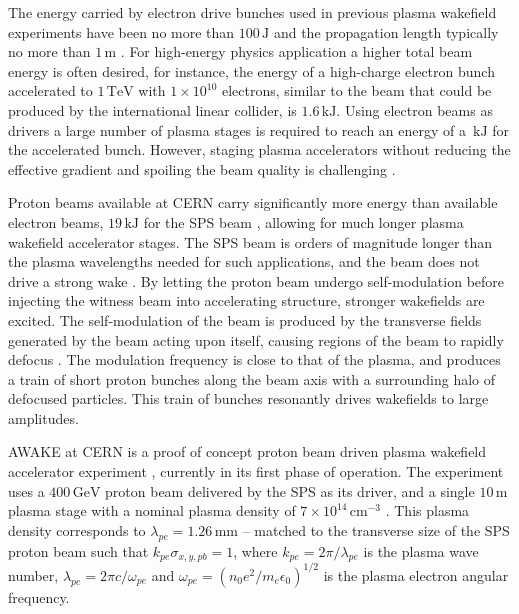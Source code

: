 \documentclass[aps,prstab,reprint,amsmath,amssymb,groupedaddress]{revtex4-1}
\newcommand{\unit}[1]{\,\mathrm{#1}}
\newcommand{\nexp}[1]{\times 10^{#1}}
\begin{document}
The energy carried by electron drive bunches used in previous plasma wakefield experiments have been no more than
$100\unit{J}$ and the propagation length typically no more than $1\unit{m}$ \cite{blumenfeld:2007,caldwell:2009}. For
high-energy physics application a higher total beam energy is often desired, for instance, the energy of a high-charge
electron bunch accelerated to $1\unit{TeV}$ with $1\nexp{10}$ electrons, similar to the beam that could be produced by
the international linear collider, is $1.6\unit{kJ}$. Using electron beams as drivers a large number of plasma stages is
required to reach %
an energy of a $\unit{kJ}$ for the accelerated bunch. However, staging plasma accelerators without reducing the
effective gradient and spoiling the beam quality is challenging \cite{steinke:2016,lindstrom:2016}.

Proton beams available at CERN carry significantly more energy than available electron beams, $19\unit{kJ}$ for the SPS
beam \cite{gschwendtner:2016}, allowing for much longer plasma wakefield accelerator stages. The SPS beam is orders of
magnitude longer than the plasma wavelengths needed for such applications, and the beam %
does not drive a strong wake \cite{gschwendtner:2016}.  By letting the proton beam undergo self-modulation before
injecting the witness beam into accelerating structure, %
stronger wakefields are %
excited. The self-modulation of the beam is produced by the transverse fields generated by the beam acting upon itself,
causing regions of the beam to rapidly defocus \cite{kumar:2010}. The modulation frequency is close to that of the
plasma, and produces a train of short proton bunches along the beam axis with a surrounding halo of defocused particles.
This train of bunches resonantly %
drives wakefields to large %
amplitudes.

AWAKE at CERN is a proof of concept proton beam driven plasma wakefield accelerator experiment
\cite{awake_collaboration:2014}, currently in its first phase of operation. The experiment uses a $400\unit{GeV}$ proton
beam delivered by the SPS as its driver, and a single $10\unit{m}$ plasma stage with a nominal plasma density of
$7\nexp{14}\unit{cm}^{-3}$ \cite{gschwendtner:2016}. This plasma density corresponds to $\lambda_{pe} = 1.26\unit{mm}$
-- matched to the transverse size of the SPS proton beam such that $k_{pe}\sigma_{x,y,pb} = 1$, where
$k_{pe} = 2\pi/\lambda_{pe}$ is the plasma wave number, %
$\lambda_{pe}=2\pi c/\omega_{pe}$ and $\omega_{pe}=\left(n_0e^2/m_e\epsilon_0\right)^{1/2}$ is the plasma electron
angular frequency.
\end{document}
